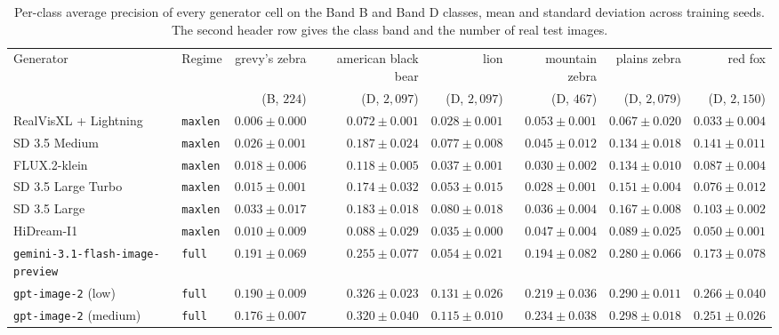 \begin{table}[p]
\centering
\footnotesize
{}
\setlength{\tabcolsep}{4pt}
\caption[Per-class average precision, data-rich classes]{Per-class average precision of every generator cell on the Band B and Band D classes, mean and standard deviation across training seeds. The second header row gives the class band and the number of real test images.}
\label{tab:appendix-per-class-ap-rich}
\begin{adjustbox}{max width=\textwidth}
\begin{tabular}{@{}llrrrrrr@{}}
    \toprule
    Generator & Regime & grevy's zebra & american black bear & lion & mountain zebra & plains zebra & red fox \\
     & & (B, $224$) & (D, $2{,}097$) & (D, $2{,}097$) & (D, $467$) & (D, $2{,}079$) & (D, $2{,}150$) \\
    \midrule
    RealVisXL + Lightning & \texttt{maxlen} & $0.006 \pm 0.000$ & $0.072 \pm 0.001$ & $0.028 \pm 0.001$ & $0.053 \pm 0.001$ & $0.067 \pm 0.020$ & $0.033 \pm 0.004$ \\
    SD 3.5 Medium & \texttt{maxlen} & $0.026 \pm 0.001$ & $0.187 \pm 0.024$ & $0.077 \pm 0.008$ & $0.045 \pm 0.012$ & $0.134 \pm 0.018$ & $0.141 \pm 0.011$ \\
    FLUX.2-klein & \texttt{maxlen} & $0.018 \pm 0.006$ & $0.118 \pm 0.005$ & $0.037 \pm 0.001$ & $0.030 \pm 0.002$ & $0.134 \pm 0.010$ & $0.087 \pm 0.004$ \\
    SD 3.5 Large Turbo & \texttt{maxlen} & $0.015 \pm 0.001$ & $0.174 \pm 0.032$ & $0.053 \pm 0.015$ & $0.028 \pm 0.001$ & $0.151 \pm 0.004$ & $0.076 \pm 0.012$ \\
    SD 3.5 Large & \texttt{maxlen} & $0.033 \pm 0.017$ & $0.183 \pm 0.018$ & $0.080 \pm 0.018$ & $0.036 \pm 0.004$ & $0.167 \pm 0.008$ & $0.103 \pm 0.002$ \\
    HiDream-I1 & \texttt{maxlen} & $0.010 \pm 0.009$ & $0.088 \pm 0.029$ & $0.035 \pm 0.000$ & $0.047 \pm 0.004$ & $0.089 \pm 0.025$ & $0.050 \pm 0.001$ \\
    \midrule
    \texttt{gemini-3.1-flash-image-preview} & \texttt{full} & $0.191 \pm 0.069$ & $0.255 \pm 0.077$ & $0.054 \pm 0.021$ & $0.194 \pm 0.082$ & $0.280 \pm 0.066$ & $0.173 \pm 0.078$ \\
    \texttt{gpt-image-2} (low) & \texttt{full} & $0.190 \pm 0.009$ & $0.326 \pm 0.023$ & $0.131 \pm 0.026$ & $0.219 \pm 0.036$ & $0.290 \pm 0.011$ & $0.266 \pm 0.040$ \\
    \texttt{gpt-image-2} (medium) & \texttt{full} & $0.176 \pm 0.007$ & $0.320 \pm 0.040$ & $0.115 \pm 0.010$ & $0.234 \pm 0.038$ & $0.298 \pm 0.018$ & $0.251 \pm 0.026$ \\

\end{tabular}
\end{adjustbox}
\end{table}
